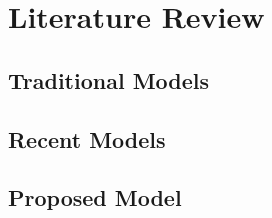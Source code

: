 \chapter{Literature Review} 
\lipsum[1-2]

\section{Traditional Models}
\lipsum[1]

\section{Recent Models}
\lipsum[1-2]

\section{Proposed Model}
\lipsum[1-2]
